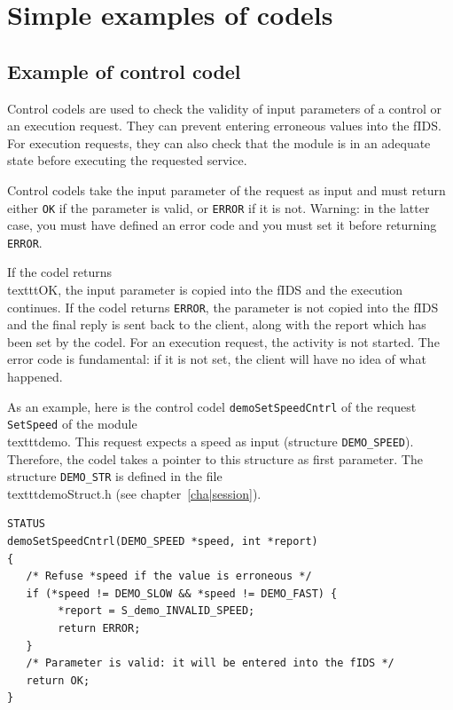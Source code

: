 \section{Simple examples of codels}

\subsection{Example of control codel}
\label{ssec|control|ex}

Control codels are used  to check the  validity of input parameters  of a
control  or  an execution request.    They can prevent entering erroneous
values  into the fIDS. For execution  requests, they can  also check that
the  module  is in   an adequate  state before  executing  the  requested
service.

Control codels take the input parameter of the  request as input and must
return either \texttt{OK} if the parameter is valid, or \texttt{ERROR} if it is
not. Warning: in the latter case, you must have defined an error code and
you must set it before returning \texttt{ERROR}.

If the  codel returns \\texttt{OK}, the  input parameter  is copied into the
fIDS and the execution  continues. If the  codel returns \texttt{ERROR}, the
parameter is not copied into the fIDS and the final reply is sent back to
the client, along with the report which has been set by the codel. For an
execution  request,  the  activity is  not  started.   The error code  is
fundamental: if it is  not  set, the client   will have no idea  of  what
happened.

As an example, here  is the control  codel \texttt{demoSetSpeedCntrl} of  the
request \texttt{SetSpeed} of the module \\texttt{demo}.  This request expects a
speed as input (structure \texttt{DEMO\_SPEED}).  Therefore, the codel takes
a pointer   to  this structure as  first  parameter.   The structure 
\texttt{DEMO\_STR}  is   defined    in  the    file  \\texttt{demoStruct.h}    (see
chapter~\ref{cha|session}).

\begin{center}\begin{cartouche}\small\begin{verbatim}
STATUS
demoSetSpeedCntrl(DEMO_SPEED *speed, int *report)
{
   /* Refuse *speed if the value is erroneous */
   if (*speed != DEMO_SLOW && *speed != DEMO_FAST) {
        *report = S_demo_INVALID_SPEED;
        return ERROR;
   }
   /* Parameter is valid: it will be entered into the fIDS */
   return OK;
}
\end{verbatim}\end{cartouche}\end{center}

